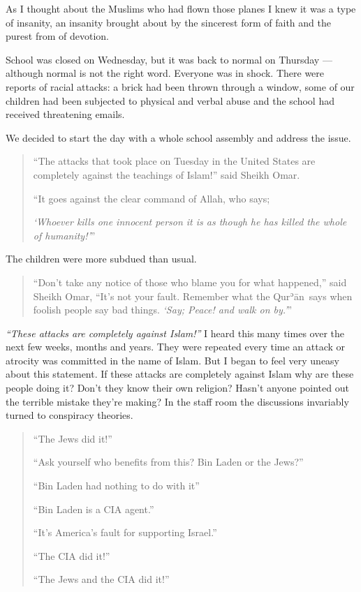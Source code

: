 \documentclass[12pt]{memoir}
\def\´{ʾ} %
\def \Quran{Qur\-\´ān} %
\begin{document}
As I thought about the Muslims who had flown those planes
I knew it was a type of insanity,
an insanity brought about by the sincerest form of faith
and the purest from of devotion.

School was closed on Wednesday, but it was back to normal on Thursday —
although normal is not the right word.
Everyone was in shock.
There were reports of racial attacks:
a brick had been thrown through a window,
some of our children had been subjected to physical
and verbal abuse and the school had received threatening emails.

We decided to start the day with a whole school assembly
and address the issue.

\begin{quote}
“The attacks that took place on Tuesday in the United States
are completely against the teachings of Islam!” said Sheikh Omar.

“It goes against the clear command of Allah, who says;

\emph{‘Whoever kills one innocent person it is as though
he has killed the whole of humanity!’}”
\end{quote}

The children were more subdued than usual.

\begin{quote}
“Don’t take any notice of those who blame you for what happened,”
said Sheikh Omar, “It’s not your fault.
Remember what the \Quran\ says when foolish people say bad things.
\emph{‘Say; Peace! and walk on by.’}”
\end{quote}

\emph{“These attacks are completely against Islam!”}
I heard this many times over the next few weeks, months and years.
They were repeated every time an attack or atrocity was committed
in the name of Islam.
But I began to feel very uneasy about this statement.
If these attacks are completely against Islam why are these people doing it?
Don’t they know their own religion?
Hasn’t anyone pointed out the terrible mistake they’re making?
In the staff room the discussions invariably turned to conspiracy theories.

\begin{quote}
“The Jews did it!”

“Ask yourself who benefits from this? Bin Laden or the Jews?”

“Bin Laden had nothing to do with it”

“Bin Laden is a CIA agent.”

“It’s America’s fault for supporting Israel.”

“The CIA did it!”

“The Jews and the CIA did it!”
\end{quote}
\end{document}
